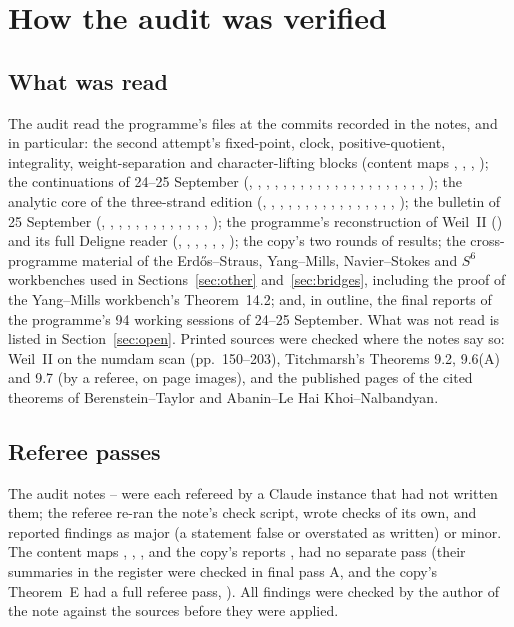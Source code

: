 \section{How the audit was verified}\label{app:verification}

\subsection{What was read}

The audit read the programme's files at the commits recorded in the notes, and in particular: the second attempt's fixed-point, clock, positive-quotient, integrality, weight-separation and character-lifting blocks (content maps , , , ); the continuations of 24--25 September (, , , , , , , , , , , , , , , , , , , , , ); the analytic core of the three-strand edition (, , , , , , , , , , , , , , , , ); the bulletin of 25 September (, , , , , , , , , , , , , ); the programme's reconstruction of Weil~II () and its full Deligne reader (, , , , , , ); the copy's two rounds of results; the cross-programme material of the Erdős--Straus, Yang--Mills, Navier--Stokes and $S^6$ workbenches used in Sections~\ref{sec:other} and~\ref{sec:bridges}, including the proof of the Yang--Mills workbench's Theorem~14.2; and, in outline, the final reports of the programme's 94 working sessions of 24--25 September. What was not read is listed in Section~\ref{sec:open}.
Printed sources were checked where the notes say so: Weil~II on the numdam scan (pp.~150--203), Titchmarsh's Theorems 9.2, 9.6(A) and 9.7 (by a referee, on page images), and the published pages of the cited theorems of Berenstein--Taylor and Abanin--Le Hai Khoi--Nalbandyan.

\subsection{Referee passes}

The audit notes -- were each refereed by a Claude instance that had not written them; the referee re-ran the note's check script, wrote checks of its own, and reported findings as major (a statement false or overstated as written) or minor. The content maps , , ,  and the copy's reports ,  had no separate pass (their summaries in the register were checked in final pass A, and the copy's Theorem~E had a full referee pass, ). All findings were checked by the author of the note against the sources before they were applied.

